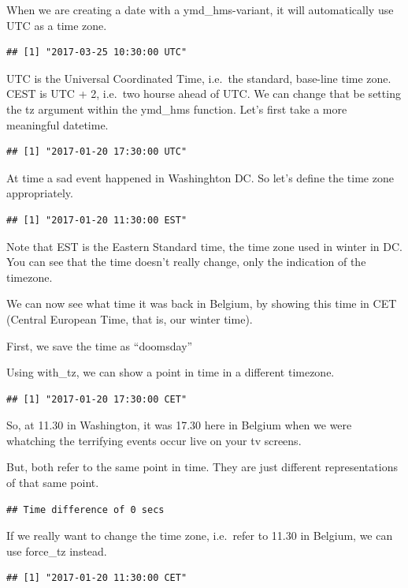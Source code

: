 \documentclass[]{tufte-book}
\begin{document}
When we are creating a date with a ymd\_hms-variant, it will automatically use UTC as a time zone.

\begin{verbatim}
## [1] "2017-03-25 10:30:00 UTC"
\end{verbatim}

UTC is the Universal Coordinated Time, i.e.~the standard, base-line time zone. CEST is UTC + 2, i.e.~two hourse ahead of UTC. We can change that be setting the tz argument within the ymd\_hms function. Let's first take a more meaningful datetime.

\begin{verbatim}
## [1] "2017-01-20 17:30:00 UTC"
\end{verbatim}

At time a sad event happened in Washinghton DC. So let's define the time zone appropriately.

\begin{verbatim}
## [1] "2017-01-20 11:30:00 EST"
\end{verbatim}

Note that EST is the Eastern Standard time, the time zone used in winter in DC. You can see that the time doesn't really change, only the indication of the timezone.

We can now see what time it was back in Belgium, by showing this time in CET (Central European Time, that is, our winter time).

First, we save the time as ``doomsday''

Using with\_tz, we can show a point in time in a different timezone.

\begin{verbatim}
## [1] "2017-01-20 17:30:00 CET"
\end{verbatim}

So, at 11.30 in Washington, it was 17.30 here in Belgium when we were whatching the terrifying events occur live on your tv screens.

But, both refer to the same point in time. They are just different representations of that same point.

\begin{verbatim}
## Time difference of 0 secs
\end{verbatim}

If we really want to change the time zone, i.e.~refer to 11.30 in Belgium, we can use force\_tz instead.

\begin{verbatim}
## [1] "2017-01-20 11:30:00 CET"
\end{verbatim}
\end{document}
